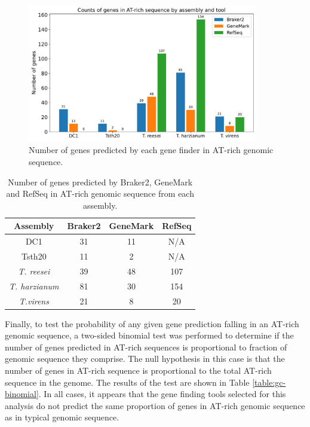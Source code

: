 \begin{figure}
  \centering
  \includegraphics[width=0.90\textwidth]{figures/atrich-genes-barplot.pdf}
  \caption[Gene counts in AT-rich regions]{Number of genes predicted by each gene finder in AT-rich genomic sequence.}
  \label{fig:gc-gene-counts}
\end{figure}

\begin{table}
  \begin{center}
    \begin{tabular}{|c|c|c|c|}
      \hline
      Assembly & Braker2 & GeneMark & RefSeq \\ \hline
      DC1 & 31 & 11 & N/A \\ \hline
      Tsth20 & 11 & 2 & N/A \\ \hline
      \textit{T. reesei} & 39 & 48 & 107 \\ \hline
      \textit{T. harzianum} & 81 & 30 & 154 \\ \hline
      \textit{T.virens} & 21 & 8 & 20 \\ \hline
    \end{tabular}
  \end{center}
  \caption[Number of genes predicted in AT-rich regions]{Number of genes predicted by Braker2, GeneMark and RefSeq
    in AT-rich genomic sequence from each assembly.}
  \label{table:gc-gene-counts}
\end{table}

Finally, to test the probability of any given gene prediction falling
in an AT-rich genomic sequence, a two-sided binomial test was
performed to determine if the number of genes predicted in AT-rich
sequences is proportional to fraction of genomic sequence they
comprise. The null hypothesis in this case is that the number of genes
in AT-rich sequence is proportional to the total AT-rich sequence in
the genome. The results of the test are shown in Table
\ref{table:gc-binomial}. In all cases, it appears that the gene
finding tools selected for this analysis do not predict the same
proportion of genes in AT-rich genomic sequence as in typical genomic
sequence.

